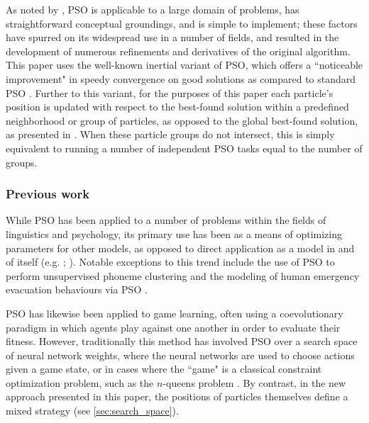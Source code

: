 \documentclass[12pt,a4paper]{article}
\begin{document}
As noted by \citet*[p.~99]{yang2014}, PSO is applicable to a large domain of problems, has straightforward conceptual groundings, and is simple to implement; these factors have spurred on its widespread use in a number of fields, and resulted in the development of numerous refinements and derivatives of the original algorithm. This paper uses the well-known inertial variant of PSO, which offers a ``noticeable improvement" in speedy convergence on good solutions as compared to standard PSO \citep[p.~101]{yang2014}. Further to this variant, for the purposes of this paper each particle's position is updated with respect to the best-found solution within a predefined neighborhood or group of particles, as opposed to the global best-found solution, as presented in \citet*[p.~79]{solnon2010}. When these particle groups do not intersect, this is simply equivalent to running a number of independent PSO tasks equal to the number of groups.



\subsubsection{Previous work}
\label{sec:pso_prev_work}

While PSO has been applied to a number of problems within the fields of linguistics and psychology, its primary use has been as a means of optimizing parameters for other models, as opposed to direct application as a model in and of itself (e.g. \citeauthor{chatterjee2005} \citeyear{chatterjee2005}; \citeauthor{mehdad2009} \citeyear{mehdad2009}). Notable exceptions to this trend include the use of PSO to perform unsupervised phoneme clustering \citep{ahmadi2007} and the modeling of human emergency evacuation behaviours via PSO \citep{cheng2008}.

PSO has likewise been applied to game learning, often using a coevolutionary paradigm in which agents play against one another in order to evaluate their fitness. However, traditionally this method has involved PSO over a search space of neural network weights, where the neural networks are used to choose actions given a game state, or in cases where the ``game" is a classical constraint optimization problem, such as the $n$-queens problem \citep[p.~349-351]{engelbrecht2005}. By contrast, in the new approach presented in this paper, the positions of particles themselves define a mixed strategy (see \autoref{sec:search_space}).  
\end{document}
